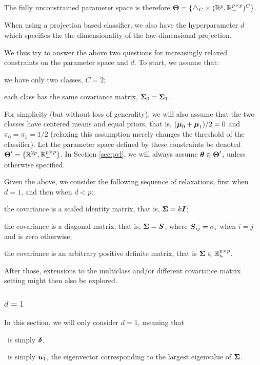 \documentclass[10pt]{article}
\begin{document}
The fully unconstrained parameter space is therefore $\boldsymbol{\Theta}=\{ \triangle_C \times (\mathbb{R}^p, \mathbb{R}^{p \times p}_+)^C \}$.

When using a projection based classifier, we also have the hyperparameter $d$ which specifies the the dimensionality of the low-dimensional projection.

We thus try to answer the above two questions for increasingly relaxed constraints on the parameter space and $d$. To start, we assume that:
\begin{compactenum}
\item we have only two classes, $C=2$;
\item each class has the same covariance matrix, $\boldsymbol{\Sigma}_0=\boldsymbol{\Sigma}_1$.
\end{compactenum}

For simplicity (but without loss of generality), we will also assume that the two classes have centered means and equal priors, that is, $(\boldsymbol{\mu}_0+\boldsymbol{\mu}_1)/2=0$ and $\pi_0=\pi_1=1/2$ (relaxing this assumption merely changes the threshold of the classifier).  Let the parameter space defined by these constraints be denoted $\boldsymbol{\Theta}' = \{\mathbb{R}^{2p}, \mathbb{R}_+^{p \times p} \}$. In Section \ref{sec:pvl}, we will always assume $\boldsymbol{\theta} \in \boldsymbol{\Theta}'$, unless otherwise specified.

Given the above, we consider the following sequence of relaxations, first when $d=1$, and then when $d < p$:
\begin{compactenum}
\item the covariance is a scaled identity matrix, that is, $\boldsymbol{\Sigma}=k \boldsymbol{I}$;
\item the covariance is a diagonal matrix, that is, $\boldsymbol{\Sigma}=\boldsymbol{S}$, where $\boldsymbol{S}_{ij}=\sigma_i$ when $i=j$ and is zero otherwise;
\item the covariance is an arbitrary positive definite matrix, that is  $\boldsymbol{\Sigma} \in \mathbb{R}^{p \times p}_\succ$.
\end{compactenum}

After those, extensions to the multiclass and/or different covariance matrix setting might then also be explored.








\subsubsection{$d=1$}

In this section, we will only consider $d=1$, meaning that
\begin{compactitem}
\item \Lol~is simply $\boldsymbol{\delta}$,
\item \Pca~is simply $\boldsymbol{u}_1$, the eigenvector corresponding to the largest eigenvalue of $\boldsymbol{\Sigma}$.
\end{compactitem}
\end{document}
